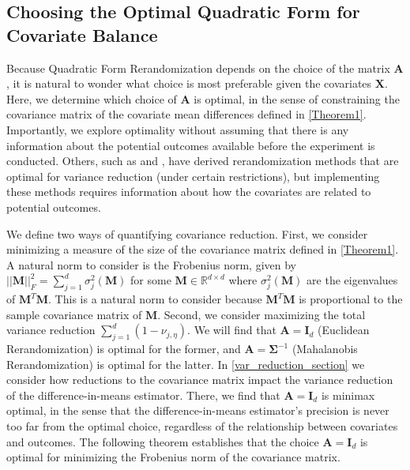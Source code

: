 \documentclass[11pt,twoside]{article}
\theoremstyle{definition}
\theoremstyle{remark}
\begin{document}
\subsection{Choosing the Optimal Quadratic Form for Covariate Balance} \label{opt_no_info}

Because Quadratic Form Rerandomization depends on the choice of the matrix $\mathbf{A}$, it is natural to wonder what choice is most preferable given the covariates $\mathbf{X}$. Here, we determine which choice of $\mathbf{A}$ is optimal, in the sense of constraining the covariance matrix of the covariate mean differences defined in \cref{Theorem1}. Importantly, we explore optimality without assuming that there is any information about the potential outcomes available before the experiment is conducted. Others, such as \cite{lu2023design} and \cite{liu2023bayesian}, have derived rerandomization methods that are optimal for variance reduction (under certain restrictions), but implementing these methods requires information about how the covariates are related to potential outcomes. 

We define two ways of quantifying covariance reduction. First, we consider minimizing a measure of the size of the covariance matrix defined in \cref{Theorem1}. A natural norm to consider is the Frobenius norm, given by $||\mathbf{M}||^2_F = \sum^d_{j=1} \sigma^2_j(\mathbf{M})$ for some $\mathbf{M} \in \mathbb{R}^{d \times d}$ where $\sigma^2_j(\mathbf{M})$ are the eigenvalues of $\mathbf{M}^T \mathbf{M}$. This is a natural norm to consider because $\mathbf{M}^T \mathbf{M}$ is proportional to the sample covariance matrix of $\mathbf{M}$. Second, we consider maximizing the total variance reduction $\sum^d_{j=1}(1 - \nu_{j, \eta})$. We will find that $\mathbf{A} = \mathbf{I}_d$ (Euclidean Rerandomization) is optimal for the former, and $\mathbf{A} = \mathbf{\Sigma}^{-1}$ (Mahalanobis Rerandomization) is optimal for the latter. In \cref{var_reduction_section} we consider how reductions to the covariance matrix impact the variance reduction of the difference-in-means estimator. There, we find that $\mathbf{A} = \mathbf{I}_d$ is minimax optimal, in the sense that the difference-in-means estimator's precision is never too far from the optimal choice, regardless of the relationship between covariates and outcomes. The following theorem establishes that the choice $\mathbf{A} = \mathbf{I}_d$ is optimal for minimizing the Frobenius norm of the covariance matrix.
\end{document}

